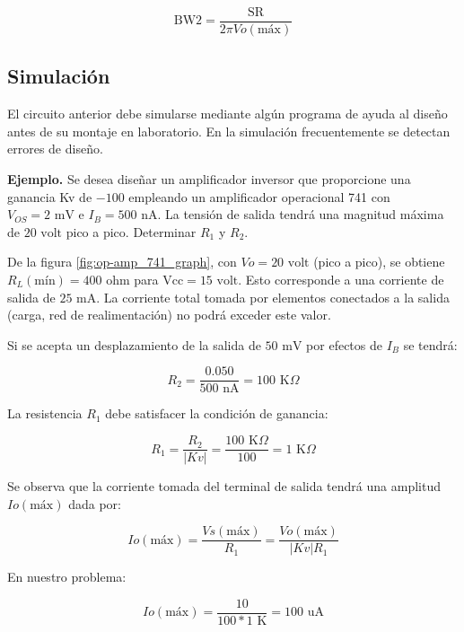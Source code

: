 \begin{equation}
	\text{BW2} = \frac{\text{SR}}{2\pi Vo(\text{máx})}
\end{equation}

\subsection{Simulación}
El circuito anterior debe simularse mediante algún programa de ayuda al diseño antes de su montaje en laboratorio. En la simulación frecuentemente se detectan errores de diseño.

\textbf{Ejemplo.} Se desea diseñar un amplificador inversor que proporcione una ganancia Kv de $-100$ empleando un amplificador operacional 741 con $V_{OS} = 2\text{ mV}$ e $I_B = 500\text{ nA}$. La tensión de salida tendrá una magnitud máxima de $20\text{ volt}$ pico a pico. Determinar $R_1$ y $R_2$.

De la figura \ref{fig:op-amp_741_graph}, con $Vo = 20\text{ volt}$ (pico a pico), se obtiene $R_L(\text{mín}) = 400\text{ ohm}$ para $\text{Vcc} = 15\text{ volt}$. Esto corresponde a una corriente de salida de $25\text{ mA}$. La corriente total tomada por elementos conectados a la salida (carga, red de realimentación) no podrá exceder este valor.

Si se acepta un desplazamiento de la salida de $50\text{ mV}$ por efectos de $I_B$ se tendrá:

\begin{equation}
	R_2 = \frac{0.050}{500\text{ nA}} = 100\text{ K}\Omega
\end{equation}

La resistencia $R_1$ debe satisfacer la condición de ganancia:

\begin{equation}
	R_1 = \frac{R_2}{|Kv|} = \frac{100\text{ K}\Omega}{100} = 1\text{ K}\Omega
\end{equation}

Se observa que la corriente tomada del terminal de salida tendrá una amplitud $Io(\text{máx})$ dada por:

\begin{equation}
	Io(\text{máx}) = \frac{Vs(\text{máx})}{R_1} = \frac{Vo(\text{máx})}{|Kv| R_1}
\end{equation}

En nuestro problema:

\begin{equation}
	Io(\text{máx}) = \frac{10}{100 * 1\text{ K}} = 100\text{ uA}
\end{equation}

